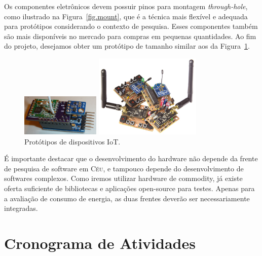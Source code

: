 \documentclass[titlepage,12pt]{article}
\newcommand{\CEU}{\textsc{C\'{e}u}\xspace}
\begin{document}
Os componentes eletrônicos devem possuir pinos para montagem
\emph{through-hole}, como ilustrado na Figura~\ref{fig.mount}, que é a técnica
mais flexível e adequada para protótipos considerando o contexto de pesquisa.
%
Esses componentes também são mais disponíveis no mercado para compras em
pequenas quantidades.
%
Ao fim do projeto, desejamos obter um protótipo de tamanho similar aos da
Figura~\ref{fig.protos}.

\begin{figure}
\begin{minipage}{0.50\textwidth}
\includegraphics[height=75px]{proto-01}
\end{minipage}
\begin{minipage}{0.50\textwidth}
\includegraphics[height=150px]{proto-03}
\end{minipage}
\caption{ Protótipos de dispositivos IoT. \label{fig.protos} }
\end{figure}

É importante destacar que o desenvolvimento do hardware não depende da frente
de pesquisa de software em \CEU, e tampouco depende do desenvolvimento de
softwares complexos.
Como iremos utilizar hardware de commodity, já existe oferta suficiente de
bibliotecas e aplicações open-source para testes.
%
Apenas para a avaliação de consumo de energia, as duas frentes deverão ser
necessariamente integradas.


\section{ Cronograma de Atividades }
\end{document}
